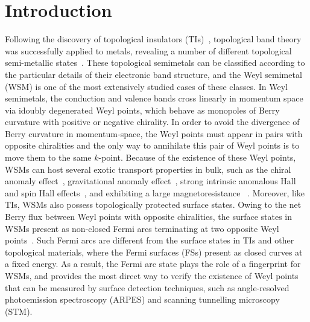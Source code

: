 \documentclass[aps,prb,reprint,superscriptaddress,amssymb,amsmath]{revtex4-1}
\begin{document}
\maketitle

\section{Introduction}
Following the discovery of topological insulators (TIs)~\cite{qi2011RMP, Hasan:2010ku}, 
topological band theory was successfully applied to metals, 
revealing a number of different topological semi-metallic states~\cite{Wan2011,Burkov2011,Young2012,Wang2012,Weng2015,Zeng2015,TaS,MoC}. 
These topological semimetals can be classified according to the particular details of their electronic band structure, 
and the Weyl semimetal (WSM) is one of the most extensively studied cases of these classes. 
In Weyl semimetals, the conduction and valence bands cross linearly in momentum space via idoubly degenerated Weyl points, 
which behave as monopoles of Berry curvature with positive or negative chirality. 
In order to avoid the divergence of Berry curvature in momentum-space, 
the Weyl points must appear in pairs with opposite chiralities and the only way to annihilate this pair of Weyl points is to move them to the same $k$-point. 
Because of the existence of these Weyl points, WSMs can host several exotic transport properties in bulk, 
such as the chiral anomaly effect~\cite{Huang2015anomaly,Zhang2016ABJ,Wang2015NbP,Niemann2017}, 
gravitational anomaly effect~\cite{Gooth2017}, strong intrinsic anomalous Hall and spin Hall effects~\cite{Burkov:2011de,Xu2011,Sun2016}, 
and exhibiting a large magnetoresistance ~\cite{Shekhar2015,Ghimire2015NbAs,Huang2015anomaly,Zhang2016ABJ,Wang2015NbP,Luo2015,Moll2015}. 
Moreover, like TIs, WSMs also possess topologically protected surface states. 
Owing to the net Berry flux between Weyl points with opposite chiralities, 
the surface states in WSMs present as non-closed Fermi arcs terminating at two opposite Weyl points~\cite{Wan2011}.
Such Fermi arcs are different from the surface states in TIs and other topological materials, 
where the Fermi surfaces (FSs) present as closed curves at a fixed energy. 
As a result, the Fermi arc state plays the role of a fingerprint for WSMs, 
and provides the most direct way to verify the existence of Weyl points that can be measured by surface detection techniques, 
such as angle-resolved photoemission spectroscopy (ARPES) and scanning tunnelling microscopy (STM).
 
\end{document}
